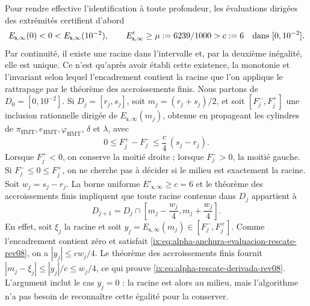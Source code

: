 Pour rendre effective l'identification à toute profondeur, les évaluations
dirigées des extrémités certifient d'abord
\[
 E_{\mathsf s,\infty}(0)<0<
 E_{\mathsf s,\infty}(10^{-2}),
 \qquad
 E'_{\mathsf s,\infty}\geq\mu:=6239/1000>c:=6
 \quad\hbox{dans }[0,10^{-2}].
\]
Par continuité, il existe une racine dans l'intervalle et, par la deuxième inégalité, elle est unique. Ce n'est qu'après avoir établi cette existence, la monotonie et l'invariant selon lequel l'encadrement contient la racine que l'on applique le rattrapage par le théorème des accroissements finis. Nous partons de \(D_0=[0,10^{-2}]\). Si \(D_j=[r_j,s_j]\), soit \(m_j=(r_j+s_j)/2\), et soit \([F_j^-,F_j^+]\) une inclusion rationnelle dirigée de \(E_{\mathsf s,\infty}(m_j)\), obtenue en propageant les cylindres de \(\pi_{\mathrm{HMT}},e_{\mathrm{HMT}},\varphi_{\mathrm{HMT}}\), \(\delta\) et \(\lambda\), avec
\begin{equation}
 0\leq F_j^+-F_j^-\leq \frac{c}{4}\,(s_j-r_j).
 \label{ix:eq:alpha-anchura-evaluacion-rescate-rev08}
\end{equation}
Lorsque \(F_j^+<0\), on conserve la moitié droite ;
lorsque \(F_j^->0\), la moitié gauche. Si
\(F_j^-\leq0\leq F_j^+\), on ne cherche pas à décider si le milieu est
exactement la racine. Soit \(w_j=s_j-r_j\). La borne uniforme
\(E'_{\mathsf s,\infty}\geq c=6\) et le théorème des accroissements finis impliquent que
toute racine contenue dans \(D_j\) appartient à
\begin{equation}
 D_{j+1}=D_j\cap
 \left[m_j-\frac{w_j}{4},
             m_j+\frac{w_j}{4}\right].
 \label{ix:eq:alpha-rescate-derivada-rev08}
\end{equation}
En effet, soit \(\xi_j\) la racine et soit
\(y_j=E_{\mathsf s,\infty}(m_j)\in[F_j^-,F_j^+]\). Comme l'encadrement contient
zéro et satisfait \eqref{ix:eq:alpha-anchura-evaluacion-rescate-rev08}, on a
\(|y_j|\leq cw_j/4\). Le théorème des accroissements finis fournit
\(|m_j-\xi_j|\leq |y_j|/c\leq w_j/4\), ce qui prouve
\eqref{ix:eq:alpha-rescate-derivada-rev08}. L'argument inclut le cas
\(y_j=0\) : la racine est alors au milieu, mais l'algorithme n'a pas
besoin de reconnaître cette égalité pour la conserver.

